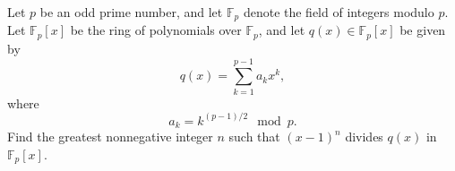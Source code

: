 Let $p$ be an odd prime number, and let $\mathbb{F}_p$ denote the field of integers modulo $p$. Let $\mathbb{F}_p[x]$ be the ring of polynomials over $\mathbb{F}_p$, and let $q(x) \in \mathbb{F}_p[x]$ be given by 
\[
q(x) = \sum_{k=1}^{p-1} a_k x^k,
\]
where
\[
a_k = k^{(p-1)/2} \mod{p}. 
\]
Find the greatest nonnegative integer $n$ such that $(x-1)^n$ divides $q(x)$ in $\mathbb{F}_p[x]$.
